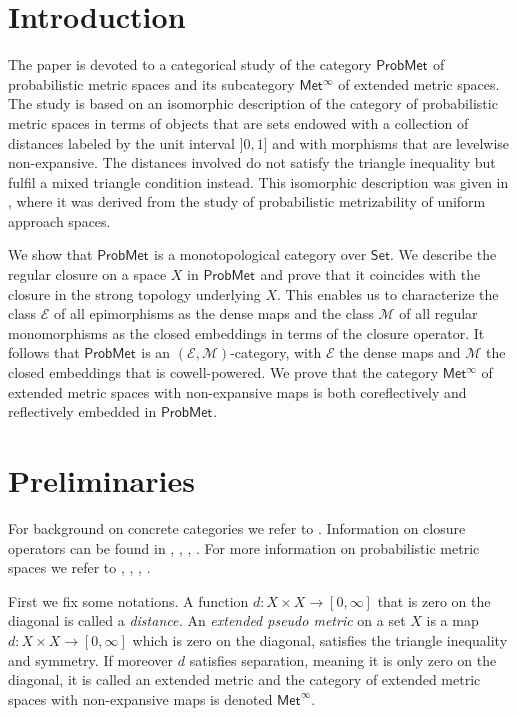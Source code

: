 \documentclass[12pt,a4paper]{amsart}
\theoremstyle{theorem}
\theoremstyle{definition}
\newcommand{\eee}{\ensuremath{\mathcal{E}}}
\newcommand{\mmm}{\ensuremath{\mathcal{M}}}
\newcommand{\PM}{\ensuremath{\mathsf{ProbMet_{}}}}
\def\rw{\rightarrow}
\begin{document}
{

\section{Introduction}
The paper is devoted to a categorical study of the category $\PM$ of probabilistic metric spaces and its subcategory $\mathsf{Met^{\infty}}$ of extended metric spaces.
The study is based on an isomorphic description of the category of probabilistic metric spaces in terms of objects that are sets endowed with a collection of distances labeled by the unit interval $]0,1]$ and with morphisms that are levelwise non-expansive. The distances involved do not satisfy the triangle inequality but fulfil a mixed triangle condition instead. This isomorphic description was given in \cite{CL2}, where it was derived from the study of probabilistic metrizability of uniform approach spaces.
 

 We show that $\PM$ is a monotopological category over $\mathsf{Set}$. We describe the regular closure on a space $X$ in $\PM$ and prove that it coincides with the closure in the strong topology underlying $X.$  This enables us to characterize the class $\mathcal{E}$ of all epimorphisms as the dense maps and the class $\mathcal{M}$ of all regular monomorphisms as the closed embeddings in terms of the closure operator.  It follows that $\PM$ is an $(\mathcal{E}, \mathcal{M})$-category, with $\eee$ the dense maps and $\mmm$ the closed embeddings that is cowell-powered. We prove that the category $\mathsf{Met^{\infty}}$ of extended metric spaces with non-expansive maps is both coreflectively and reflectively embedded in $\PM.$ 



 \newpage  


\section{Preliminaries}

For background on concrete categories we refer to \cite{AHS}. Information on closure operators can be found in \cite{CGT}, \cite{DGT}, \cite{DG}, \cite{DT}. 
For more information on probabilistic metric spaces we refer to \cite{SS}, \cite{LSY}, \cite{N}, \cite{CS}. 

First we fix some notations.
A function $d: X \times X \rw [0, \infty]$  that is zero on the diagonal  is called a \emph{distance.} 
An \emph{extended pseudo metric} on a set $X$ is a map $d: X \times X \rw [0, \infty]$ which is zero on the diagonal, satisfies the triangle inequality and symmetry. If moreover $d$ satisfies separation, meaning it is only zero on the diagonal, it is called an extended metric and the category of extended metric spaces with non-expansive maps is denoted $\mathsf{Met}^\infty$. 




}
\end{document}
